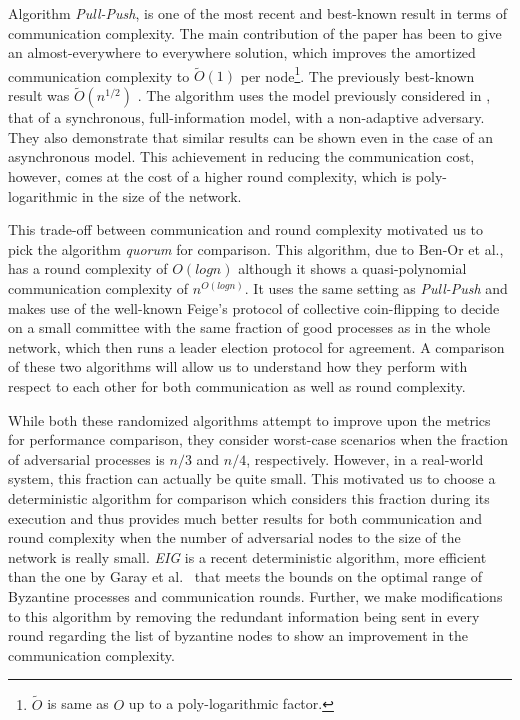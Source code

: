 Algorithm \textit{Pull-Push}, is one of the most recent and best-known result
in terms of communication complexity. The main contribution of the paper has
been to give an almost-everywhere to everywhere solution, which improves the
amortized communication complexity to $\tilde{O}(1)$ per
node\footnote{$\tilde{O}$ is same as $O$ up to a poly-logarithmic factor.}. The
previously best-known result was $\tilde{O}(n^{1/2})$ \cite{KLST11}.  The
algorithm uses the model previously considered in
\cite{KLST11,KSSV06,BPV06,KS09}, that of a synchronous, full-information model,
with a non-adaptive adversary. They also demonstrate that similar results can
be shown even in the case of an asynchronous model. This achievement in
reducing the communication cost, however, comes at the cost of a higher round
complexity, which is poly-logarithmic in the size of the network. 

This trade-off between communication and round complexity motivated us to pick
the algorithm \textit{quorum} for comparison. This algorithm, due to Ben-Or et
al., has a round complexity of $O(logn)$ although it shows a quasi-polynomial
communication complexity of $n^{O(logn)}$.  It uses the same setting as
\textit{Pull-Push} and makes use of the well-known Feige's protocol of
collective coin-flipping to decide on a small committee with the same fraction
of good processes as in the whole network, which then runs a leader election
protocol for agreement. A comparison of these two algorithms will allow us to
understand how they perform with respect to each other for both communication
as well as round complexity. 

While both these randomized algorithms attempt to improve upon the metrics for
performance comparison, they consider worst-case scenarios when the fraction of
adversarial processes is $n/3$ and $n/4$, respectively. However, in
a real-world system, this fraction can actually be quite small. This
motivated us to choose a deterministic algorithm for comparison which considers
this fraction during its execution and thus provides much
better results for both communication and round complexity when the number of
adversarial nodes to the size of the network is really small. \textit{EIG} is
a recent deterministic algorithm, more efficient than the one by Garay et
al.~\cite{GarayM98} that meets the bounds on the optimal range of Byzantine
processes and communication rounds. Further, we make modifications
to this algorithm by removing the redundant information being sent in every round
regarding the list of byzantine nodes to show an improvement in the
communication complexity. 


